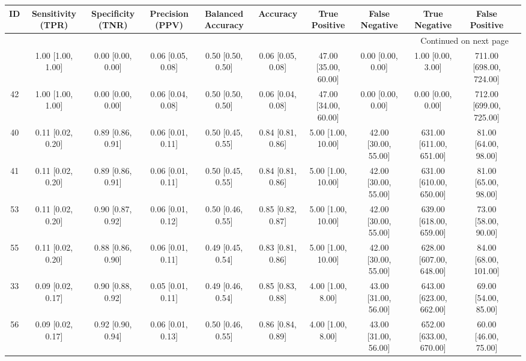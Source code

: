 \documentclass[8pt]{article}
\begin{document}
\begin{center}
\begin{footnotesize}
\begin{longtable}{|ccccccccccc|}
\toprule
 ID &  Sensitivity (TPR) &  Specificity (TNR) &    Precision (PPV) &  Balanced Accuracy &           Accuracy &         True Positive &        False Negative &            True Negative &           False Positive \\
\midrule
\endhead
\midrule
\multicolumn{10}{r}{{Continued on next page}} \\
\midrule
\endfoot

\bottomrule
\endlastfoot
 38 &  1.00 [1.00, 1.00] &  0.00 [0.00, 0.00] &  0.06 [0.05, 0.08] &  0.50 [0.50, 0.50] &  0.06 [0.05, 0.08] &  47.00 [35.00, 60.00] &     0.00 [0.00, 0.00] &        1.00 [0.00, 3.00] &  711.00 [698.00, 724.00] \\
 42 &  1.00 [1.00, 1.00] &  0.00 [0.00, 0.00] &  0.06 [0.04, 0.08] &  0.50 [0.50, 0.50] &  0.06 [0.04, 0.08] &  47.00 [34.00, 60.00] &     0.00 [0.00, 0.00] &        0.00 [0.00, 0.00] &  712.00 [699.00, 725.00] \\
 40 &  0.11 [0.02, 0.20] &  0.89 [0.86, 0.91] &  0.06 [0.01, 0.11] &  0.50 [0.45, 0.55] &  0.84 [0.81, 0.86] &    5.00 [1.00, 10.00] &  42.00 [30.00, 55.00] &  631.00 [611.00, 651.00] &     81.00 [64.00, 98.00] \\
 41 &  0.11 [0.02, 0.20] &  0.89 [0.86, 0.91] &  0.06 [0.01, 0.11] &  0.50 [0.45, 0.55] &  0.84 [0.81, 0.86] &    5.00 [1.00, 10.00] &  42.00 [30.00, 55.00] &  631.00 [610.00, 650.00] &     81.00 [65.00, 98.00] \\
 53 &  0.11 [0.02, 0.20] &  0.90 [0.87, 0.92] &  0.06 [0.01, 0.12] &  0.50 [0.46, 0.55] &  0.85 [0.82, 0.87] &    5.00 [1.00, 10.00] &  42.00 [30.00, 55.00] &  639.00 [618.00, 659.00] &     73.00 [58.00, 90.00] \\
 55 &  0.11 [0.02, 0.20] &  0.88 [0.86, 0.90] &  0.06 [0.01, 0.11] &  0.49 [0.45, 0.54] &  0.83 [0.81, 0.86] &    5.00 [1.00, 10.00] &  42.00 [30.00, 55.00] &  628.00 [607.00, 648.00] &    84.00 [68.00, 101.00] \\
 33 &  0.09 [0.02, 0.17] &  0.90 [0.88, 0.92] &  0.05 [0.01, 0.11] &  0.49 [0.46, 0.54] &  0.85 [0.83, 0.88] &     4.00 [1.00, 8.00] &  43.00 [31.00, 56.00] &  643.00 [623.00, 662.00] &     69.00 [54.00, 85.00] \\
 56 &  0.09 [0.02, 0.17] &  0.92 [0.90, 0.94] &  0.06 [0.01, 0.13] &  0.50 [0.46, 0.55] &  0.86 [0.84, 0.89] &     4.00 [1.00, 8.00] &  43.00 [31.00, 56.00] &  652.00 [633.00, 670.00] &     60.00 [46.00, 75.00] \\

\end{longtable}
\end{footnotesize}
\end{center}
\end{document}
